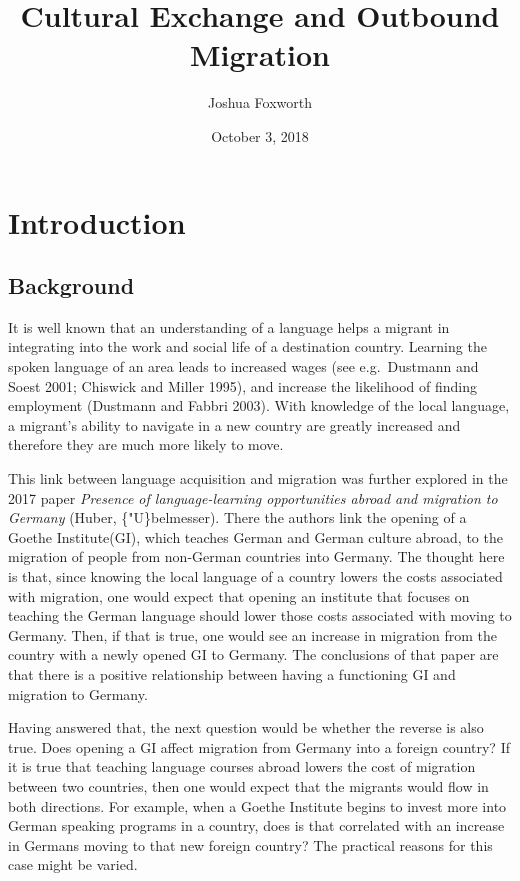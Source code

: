 \documentclass[]{article}
\title{Cultural Exchange and Outbound Migration}
\author{Joshua Foxworth}
\date{October 3, 2018}
\begin{document}
\maketitle

{
\setcounter{tocdepth}{2}
\tableofcontents
}
\section{Introduction}\label{introduction}

\subsection{Background}\label{background}

It is well known that an understanding of a language helps a migrant in
integrating into the work and social life of a destination country.
Learning the spoken language of an area leads to increased wages (see
e.g.~Dustmann and Soest 2001; Chiswick and Miller 1995), and increase
the likelihood of finding employment (Dustmann and Fabbri 2003). With
knowledge of the local language, a migrant's ability to navigate in a
new country are greatly increased and therefore they are much more
likely to move.

This link between language acquisition and migration was further
explored in the 2017 paper
\textit{Presence of language-learning opportunities abroad and migration to Germany}
(Huber, \{"U\}belmesser). There the authors link the opening of a Goethe
Institute(GI), which teaches German and German culture abroad, to the
migration of people from non-German countries into Germany. The thought
here is that, since knowing the local language of a country lowers the
costs associated with migration, one would expect that opening an
institute that focuses on teaching the German language should lower
those costs associated with moving to Germany. Then, if that is true,
one would see an increase in migration from the country with a newly
opened GI to Germany. The conclusions of that paper are that there is a
positive relationship between having a functioning GI and migration to
Germany.

Having answered that, the next question would be whether the reverse is
also true. Does opening a GI affect migration from Germany into a
foreign country? If it is true that teaching language courses abroad
lowers the cost of migration between two countries, then one would
expect that the migrants would flow in both directions. For example,
when a Goethe Institute begins to invest more into German speaking
programs in a country, does is that correlated with an increase in
Germans moving to that new foreign country? The practical reasons for
this case might be varied.
\end{document}
